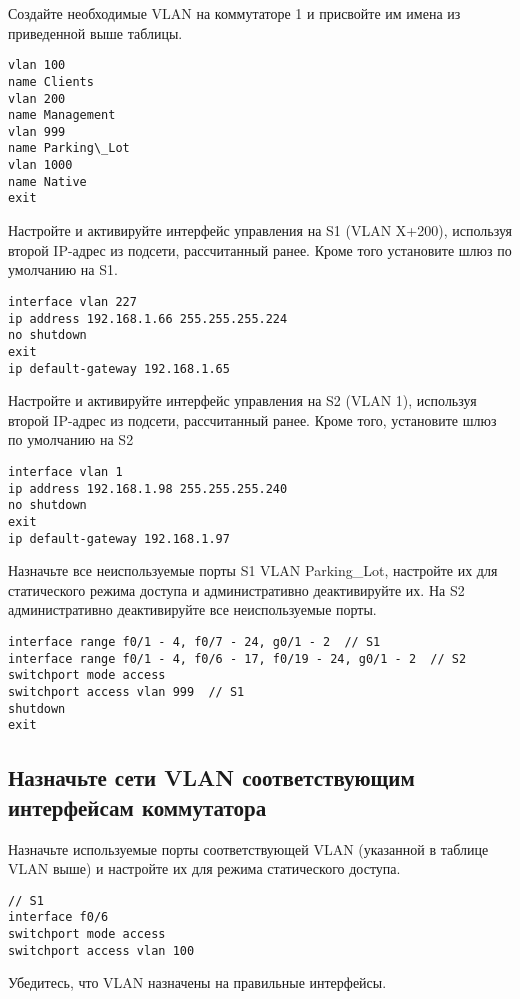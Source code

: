 Создайте необходимые VLAN на коммутаторе 1
и присвойте им имена из приведенной выше таблицы.

\begin{verbatim}
vlan 100
name Clients
vlan 200
name Management
vlan 999
name Parking\_Lot
vlan 1000
name Native
exit
\end{verbatim}

Настройте и активируйте интерфейс управления на S1 (VLAN X+200),
используя второй IP-адрес из подсети, рассчитанный ранее.
Кроме того установите шлюз по умолчанию на S1.

\begin{verbatim}
interface vlan 227
ip address 192.168.1.66 255.255.255.224
no shutdown
exit
ip default-gateway 192.168.1.65
\end{verbatim}

Настройте и активируйте интерфейс управления на S2 (VLAN 1),
используя второй IP-адрес из подсети, рассчитанный ранее.
Кроме того, установите шлюз по умолчанию на S2

\begin{verbatim}
interface vlan 1
ip address 192.168.1.98 255.255.255.240
no shutdown
exit
ip default-gateway 192.168.1.97
\end{verbatim}

Назначьте все неиспользуемые порты S1 VLAN Parking\_Lot,
настройте их для статического режима доступа
и административно деактивируйте их.
На S2 административно деактивируйте все неиспользуемые порты.

\begin{verbatim}
interface range f0/1 - 4, f0/7 - 24, g0/1 - 2  // S1
interface range f0/1 - 4, f0/6 - 17, f0/19 - 24, g0/1 - 2  // S2
switchport mode access
switchport access vlan 999  // S1
shutdown
exit
\end{verbatim}

\subsection{Назначьте сети VLAN соответствующим интерфейсам коммутатора}

Назначьте используемые порты соответствующей VLAN
(указанной в таблице VLAN выше)
и настройте их для режима статического доступа.

\begin{verbatim}
// S1
interface f0/6
switchport mode access
switchport access vlan 100
\end{verbatim}


Убедитесь, что VLAN назначены на правильные интерфейсы.

